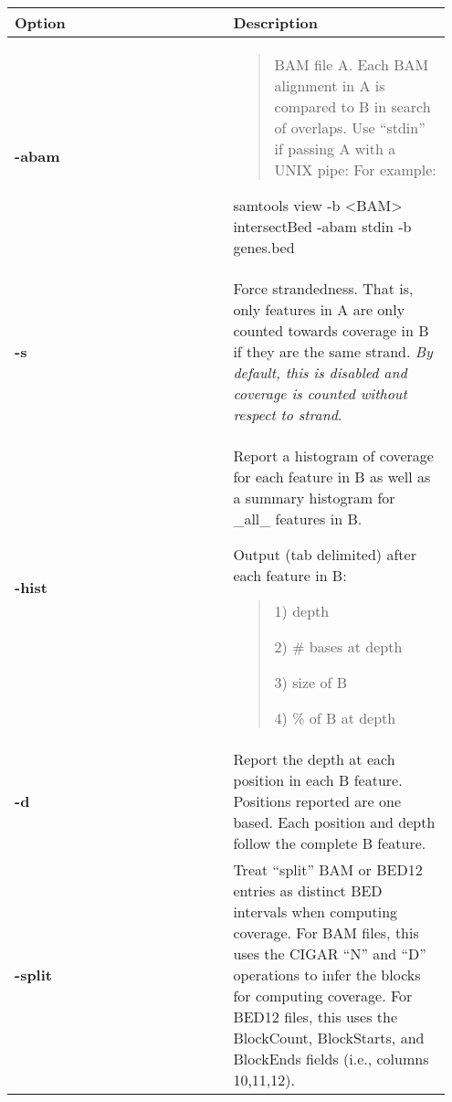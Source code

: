 \documentclass[letterpaper,10pt,english]{sphinxmanual}
\begin{document}
\begin{tabular}{|p{0.475\linewidth}|p{0.475\linewidth}|}
\hline
\textbf{
Option
} & \textbf{
Description
}\\\hline

\textbf{-abam}
 & \begin{quote}

BAM file A. Each BAM alignment in A is compared to B in search of overlaps. Use ``stdin'' if passing A with a UNIX pipe: For example:
\end{quote}

\begin{DUlineblock}{0em}
\item[] samtools view -b \textless{}BAM\textgreater{} \textbar{} intersectBed -abam stdin -b genes.bed
\end{DUlineblock}
\\\hline

\textbf{-s}
 & 
Force strandedness. That is, only features in A are only counted towards coverage in B if they are the same strand. \emph{By default, this is disabled and coverage is counted without respect to strand}.
\\\hline

\textbf{-hist}
 & 
Report a histogram of coverage for each feature in B as well as a summary histogram for \_all\_ features in B.

\begin{DUlineblock}{0em}
\item[] Output (tab delimited) after each feature in B:
\end{DUlineblock}
\begin{quote}

\begin{DUlineblock}{0em}
\item[] 1) depth
\item[] 2) \# bases at depth
\item[] 3) size of B
\item[] 4) \% of B at depth
\end{DUlineblock}
\end{quote}
\\\hline

\textbf{-d}
 & 
Report the depth at each position in each B feature. Positions reported are one based. Each position and depth follow the complete B feature.
\\\hline

\textbf{-split}
 & 
Treat ``split'' BAM or BED12 entries as distinct BED intervals when computing coverage. For BAM files, this uses the CIGAR ``N'' and ``D'' operations to infer the blocks for computing coverage. For BED12 files, this uses the BlockCount, BlockStarts, and BlockEnds fields (i.e., columns 10,11,12).
\\\hline
\end{tabular}
\end{document}
